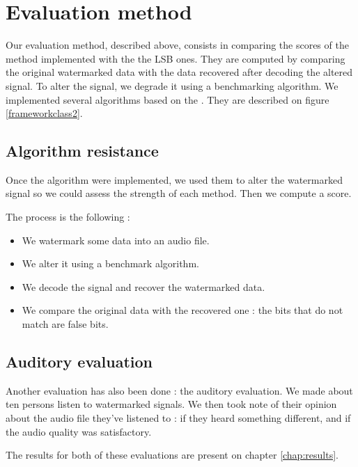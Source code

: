 \section{Evaluation method}
Our evaluation method, described above, consists in comparing the scores of the method implemented with the the \ac{LSB} ones.
They are computed by comparing the original watermarked data with the data recovered after decoding the altered signal. 
To alter the signal, we degrade it using a benchmarking algorithm. We implemented several algorithms based on the . They are described on figure \ref{frameworkclass2}.

\subsection{Algorithm resistance}
Once the algorithm were implemented, we used them to alter the watermarked signal so we could assess the strength of each method. Then we compute a score. 

The process is the following :
\begin{itemize}
 \item We watermark some data into an audio file.
 \item We alter it using a benchmark algorithm.
 \item We decode the signal and recover the watermarked data.
 \item We compare the original data with the recovered one : the bits that do not match are false bits.
\end{itemize}

\subsection{Auditory evaluation}
Another evaluation has also been done : the auditory evaluation. We made about ten persons listen to watermarked signals. 
We then took note of their opinion about the audio file they've listened to : if they heard something different, and if the audio quality was satisfactory. 

The results for both of these evaluations are present on chapter \ref{chap:results}.
